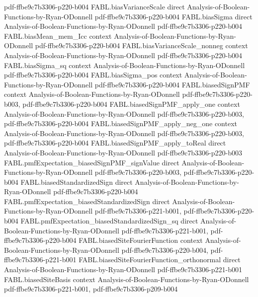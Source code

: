 \begin{theorem}
{    pdf-ffbe9c7b3306-p220-b004}
\proofstep
  {FABL.biasVarianceScale}
  {direct}
  {Analysis-of-Boolean-Functions-by-Ryan-ODonnell}
  {pdf-ffbe9c7b3306-p220-b004}
\proofstep
  {FABL.biasSigma}
  {direct}
  {Analysis-of-Boolean-Functions-by-Ryan-ODonnell}
  {pdf-ffbe9c7b3306-p220-b004}
\proofstep
  {FABL.biasMean_mem_Icc}
  {context}
  {Analysis-of-Boolean-Functions-by-Ryan-ODonnell}
  {pdf-ffbe9c7b3306-p220-b004}
\proofstep
  {FABL.biasVarianceScale_nonneg}
  {context}
  {Analysis-of-Boolean-Functions-by-Ryan-ODonnell}
  {pdf-ffbe9c7b3306-p220-b004}
\proofstep
  {FABL.biasSigma_sq}
  {context}
  {Analysis-of-Boolean-Functions-by-Ryan-ODonnell}
  {pdf-ffbe9c7b3306-p220-b004}
\proofstep
  {FABL.biasSigma_pos}
  {context}
  {Analysis-of-Boolean-Functions-by-Ryan-ODonnell}
  {pdf-ffbe9c7b3306-p220-b004}
\proofstep
  {FABL.biasedSignPMF}
  {context}
  {Analysis-of-Boolean-Functions-by-Ryan-ODonnell}
  {pdf-ffbe9c7b3306-p220-b003,
    pdf-ffbe9c7b3306-p220-b004}
\proofstep
  {FABL.biasedSignPMF_apply_one}
  {context}
  {Analysis-of-Boolean-Functions-by-Ryan-ODonnell}
  {pdf-ffbe9c7b3306-p220-b003,
    pdf-ffbe9c7b3306-p220-b004}
\proofstep
  {FABL.biasedSignPMF_apply_neg_one}
  {context}
  {Analysis-of-Boolean-Functions-by-Ryan-ODonnell}
  {pdf-ffbe9c7b3306-p220-b003,
    pdf-ffbe9c7b3306-p220-b004}
\proofstep
  {FABL.biasedSignPMF_apply_toReal}
  {direct}
  {Analysis-of-Boolean-Functions-by-Ryan-ODonnell}
  {pdf-ffbe9c7b3306-p220-b003}
\proofstep
  {FABL.pmfExpectation_biasedSignPMF_signValue}
  {direct}
  {Analysis-of-Boolean-Functions-by-Ryan-ODonnell}
  {pdf-ffbe9c7b3306-p220-b003,
    pdf-ffbe9c7b3306-p220-b004}
\proofstep
  {FABL.biasedStandardizedSign}
  {direct}
  {Analysis-of-Boolean-Functions-by-Ryan-ODonnell}
  {pdf-ffbe9c7b3306-p220-b004}
\proofstep
  {FABL.pmfExpectation_biasedStandardizedSign}
  {direct}
  {Analysis-of-Boolean-Functions-by-Ryan-ODonnell}
  {pdf-ffbe9c7b3306-p221-b001,
    pdf-ffbe9c7b3306-p220-b004}
\proofstep
  {FABL.pmfExpectation_biasedStandardizedSign_sq}
  {direct}
  {Analysis-of-Boolean-Functions-by-Ryan-ODonnell}
  {pdf-ffbe9c7b3306-p221-b001,
    pdf-ffbe9c7b3306-p220-b004}
\proofstep
  {FABL.biasedSiteFourierFunction}
  {context}
  {Analysis-of-Boolean-Functions-by-Ryan-ODonnell}
  {pdf-ffbe9c7b3306-p220-b004,
    pdf-ffbe9c7b3306-p221-b001}
\proofstep
  {FABL.biasedSiteFourierFunction_orthonormal}
  {direct}
  {Analysis-of-Boolean-Functions-by-Ryan-ODonnell}
  {pdf-ffbe9c7b3306-p221-b001}
\proofstep
  {FABL.biasedSiteBasis}
  {context}
  {Analysis-of-Boolean-Functions-by-Ryan-ODonnell}
  {pdf-ffbe9c7b3306-p221-b001,
    pdf-ffbe9c7b3306-p209-b004}

\end{theorem}
